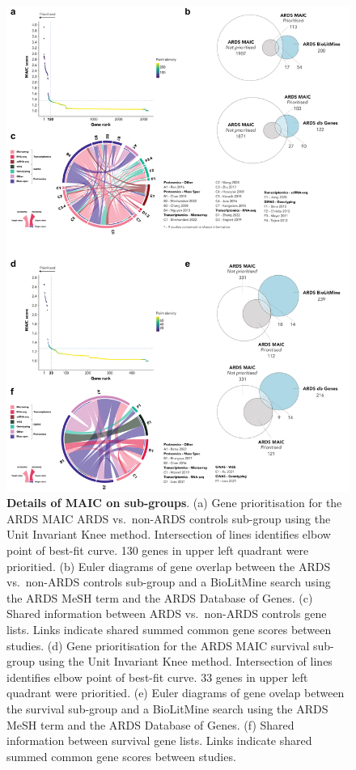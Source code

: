 \documentclass[
  11,
  a4paper,
]{article}
\begin{document}
\begin{figure}[H]

{\centering \includegraphics{../img/Supplementary_Figure_7.png}

}

\caption{\textbf{Details of MAIC on sub-groups}. (a) Gene prioritisation
for the ARDS MAIC ARDS vs.~non-ARDS controls sub-group using the Unit
Invariant Knee method. Intersection of lines identifies elbow point of
best-fit curve. 130 genes in upper left quadrant were prioritied. (b)
Euler diagrams of gene overlap between the ARDS vs.~non-ARDS controls
sub-group and a BioLitMine search using the ARDS MeSH term and the ARDS
Database of Genes. (c) Shared information between ARDS vs.~non-ARDS
controls gene lists. Links indicate shared summed common gene scores
between studies. (d) Gene prioritisation for the ARDS MAIC survival
sub-group using the Unit Invariant Knee method. Intersection of lines
identifies elbow point of best-fit curve. 33 genes in upper left
quadrant were prioritied. (e) Euler diagrams of gene ovelap between the
survival sub-group and a BioLitMine search using the ARDS MeSH term and
the ARDS Database of Genes. (f) Shared information between survival gene
lists. Links indicate shared summed common gene scores between studies.}

\end{figure}%
\end{document}

